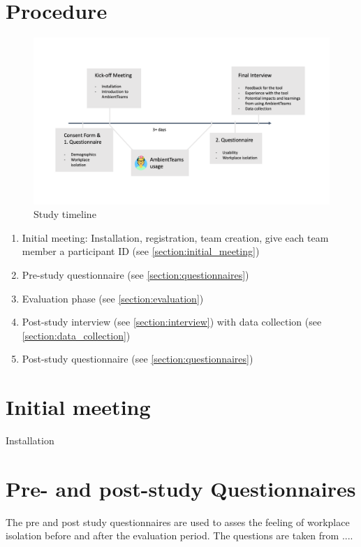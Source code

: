 \section{Procedure}

\begin{figure}[h]
    \centering
    \includegraphics[width=.8\linewidth]{./images/Study_Timeline.png}
    \caption{Study timeline}
    \label{fig:study_timeline}
\end{figure}

\begin{enumerate}
    \item Initial meeting: Installation, registration, team creation, give each team member a participant ID (see \autoref{section:initial_meeting})
    \item Pre-study questionnaire (see \autoref{section:questionnaires})
    \item Evaluation phase (see \autoref{section:evaluation})
    \item Post-study interview (see \autoref{section:interview}) with data collection (see \autoref{section:data_collection})
    \item  Post-study questionnaire (see \autoref{section:questionnaires})
\end{enumerate}

\section{Initial meeting}
\label{section:initial_meeting}
Installation

\section{Pre- and post-study Questionnaires}
\label{section:questionnaires}
The pre and post study questionnaires are used to asses the feeling of workplace isolation before and after the evaluation period. The questions are taken from ....

